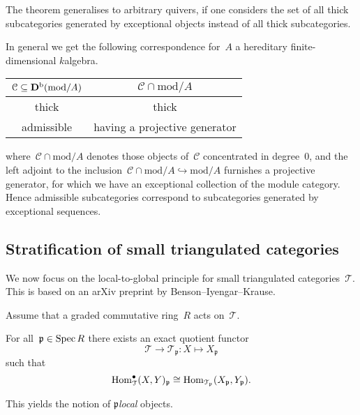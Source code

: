 \documentclass[10pt,a4paper]{article}
\begin{document}
\begin{remark}
  The theorem generalises to arbitrary quivers, if one considers the set of all thick subcategories generated by exceptional objects instead of all thick subcategories.

  In general we get the following correspondence for~$A$ a hereditary finite-dimensional $k$\dash algebra.

  \begin{center}
    \begin{tabular}{cc}
      \toprule
      $\mathcal{C}\subseteq\mathbf{D}^{\mathrm{b}}(\mathrm{mod}/A)$ & $\mathcal{C}\cap\mathrm{mod}/A$ \\\midrule
      thick & thick \\
      admissible & having a projective generator \\
      \bottomrule
    \end{tabular}
  \end{center}

  where~$\mathcal{C}\cap\mathrm{mod}/A$ denotes those objects of~$\mathcal{C}$ concentrated in degree~0, and the left adjoint to the inclusion~$\mathcal{C}\cap\mathrm{mod}/A\hookrightarrow\mathrm{mod}/A$ furnishes a projective generator, for which we have an exceptional collection of the module category. Hence admissible subcategories correspond to subcategories generated by exceptional sequences.
\end{remark}


\subsection{Stratification of small triangulated categories}
We now focus on the local-to-global principle for small triangulated categories~$\mathcal{T}$. This is based on an arXiv preprint by Benson--Iyengar--Krause.

Assume that a graded commutative ring~$R$ acts on~$\mathcal{T}$.
\begin{proposition}
  For all~$\mathfrak{p}\in\operatorname{Spec} R$ there exists an exact quotient functor
  \begin{equation}
    \mathcal{T}\to\mathcal{T}_{\mathfrak{p}}:X\mapsto X_{\mathfrak{p}}
  \end{equation}
  such that
  \begin{equation}
    \operatorname{Hom}_{\mathcal{T}}^\bullet(X,Y)_{\mathfrak{p}}\cong\operatorname{Hom}_{\mathcal{T}_{\mathfrak{p}}}(X_{\mathfrak{p}},Y_{\mathfrak{p}}).
  \end{equation}
\end{proposition}
This yields the notion of \emph{$\mathfrak{p}$\dash local} objects.
\end{document}
